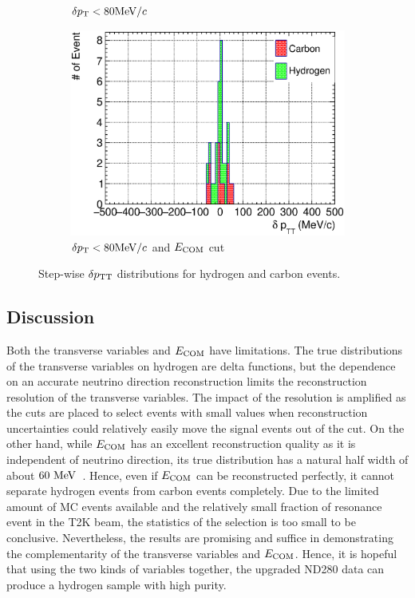 \begin{figure}
\begin{subfigure}[b]{\trfigwid\textwidth}
          \caption{$\delta p_\textrm{T} < 80\textrm{MeV}/c$}
          \label{subfig:hsel-dang-dpt80}
     \end{subfigure}
     \begin{subfigure}[b]{\trfigwid\textwidth}
          \centering
          \includegraphics[width=\textwidth]{figures/perf/tki/SFGpTPCmu_dptt_stack_al15_GetH_dpt80_wdang.eps}
          \caption{$\delta p_\textrm{T} < 80\textrm{MeV}/c$ and $E_{\textrm{COM}}$ cut}
          \label{subfig:hsel-dang-dpt80-ecom}
     \end{subfigure}
     \caption{Step-wise $\delta p_\textrm{TT}$ distributions for hydrogen and carbon events.}
     \label{fig:hsel-dptt-step}
     \end{figure}

     \subsection{Discussion}
     Both the transverse variables and $E_{\textrm{COM}}$ have limitations.
     The true distributions of the transverse variables on hydrogen are delta functions, but the dependence on an accurate neutrino direction reconstruction limits the reconstruction resolution of the transverse variables.
     The impact of the resolution is amplified as the cuts are placed to select events with small values when reconstruction uncertainties could relatively easily move the signal events out of the cut.
     On the other hand, while $E_{\textrm{COM}}$ has an excellent reconstruction quality as it is independent of neutrino direction, its true distribution has a natural half width of about $60~\textrm{MeV}$~\cite{ParticleDataGroup:2024cfk}.
     Hence, even if $E_{\textrm{COM}}$ can be reconstructed perfectly, it cannot separate hydrogen events from carbon events completely.
     Due to the limited amount of MC events available and the relatively small fraction of resonance event in the T2K beam, the statistics of the selection is too small to be conclusive.
     Nevertheless, the results are promising and suffice in demonstrating the complementarity of the transverse variables and $E_{\textrm{COM}}$.
     Hence, it is hopeful that using the two kinds of variables together, the upgraded ND280 data can produce a hydrogen sample with high purity.
